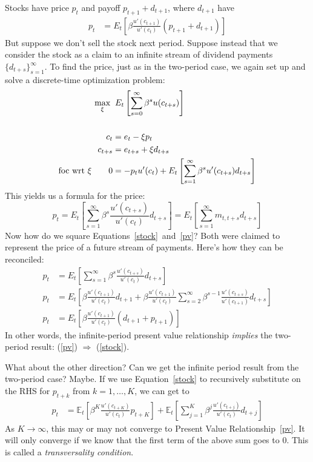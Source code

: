\documentclass[12pt]{article}
\theoremstyle{plain}
\theoremstyle{definition}
\theoremstyle{remark}
\begin{document}
Stocks have price $p_t$ and payoff $p_{t+1} + d_{t+1}$, where $d_{t+1}$
have
\begin{align}
  p_t &= E_t\left[
  \beta\frac{u'(c_{t+1})}{u'(c_{t})} (p_{t+1}+d_{t+1}) \right]
  \label{stock}
\end{align}
But suppose we don't sell the stock next period. Suppose instead that we
consider the stock as a claim to an infinite stream of dividend payments
$\{d_{t+s}\}_{s=1}^\infty$. To find the price, just as in the two-period
case, we again set up and solve a discrete-time optimization problem:
\begin{align}
  \max_{\xi} \; & \;
  E_t \left[ \sum^\infty_{s=0} \beta^s u(c_{t+s}) \right]
  \label{infobjfcn}\\\notag\\
    c_t &= e_t - \xi p_t \notag \\
    c_{t+s} &= e_{t+s} + \xi d_{t+s} \notag \\
    \text{foc wrt $\xi$} \qquad 0 &= -p_t u'(c_t) +
  E_t \left[\sum^\infty_{s=1} \beta^s u'(c_{t+s}) d_{t+s}\right]
\end{align}
This yields us a formula for the price:
\begin{equation}
    p_t =
    E_t \left[\sum^\infty_{s=1} \beta^s \frac{u'(c_{t+s})}{u'(c_t)}
    d_{t+s}\right]
    =
    E_t \left[\sum^\infty_{s=1} m_{t,t+s} d_{t+s}\right]
    \label{pv}
\end{equation}
Now how do we square Equations~\ref{stock}~and~\ref{pv}? Both were
claimed to represent the price of a future stream of payments. Here's
how they can be reconciled:
\begin{align*}
  p_t
  &= E_t \left[
    \sum^\infty_{s=1} \beta^s \frac{u'(c_{t+s})}{u'(c_t)} d_{t+s}
  \right] \\
  p_t&= E_t \left[
  \beta \frac{u'(c_{t+1})}{u'(c_t)} d_{t+1}
  + \beta \frac{u'(c_{t+1})}{u'(c_t)}
  \sum^\infty_{s=2} \beta^{s-1} \frac{u'(c_{t+s})}{u'(c_{t+1})} d_{t+s}
  \right] \\
  p_t&= E_t \left[
  \beta \frac{u'(c_{t+1})}{u'(c_t)} (d_{t+1} +p_{t+1})
  \right]
\end{align*}
In other words, the infinite-period present value relationship
\emph{implies} the two-period result: (\ref{pv}) $\Rightarrow$
(\ref{stock}).

What about the other direction? Can we get the infinite period result
from the two-period case? Maybe. If we use Equation~\ref{stock} to
recursively substitute on the RHS for $p_{t+k}$ from $k=1,\ldots,K$, we
can get to
\begin{align}
  p_t &=
  \mathbb{E}_t\left[
    \beta^K \frac{u'(c_{t+K})}{u'(c_t)} p_{t+K}
  \right]
  +\mathbb{E}_t\left[
    \sum^K_{j=1}
    \beta^j \frac{u'(c_{t+j})}{u'(c_t)} d_{t+j}
  \right]
  \label{eq:rationalBubbles}
\end{align}
As $K\rightarrow\infty$, this may or may not converge to Present Value
Relationship~\ref{pv}. It will only converge if we know that the first
term of the above sum goes to 0. This is called a \emph{transversality
condition}.
\end{document}
